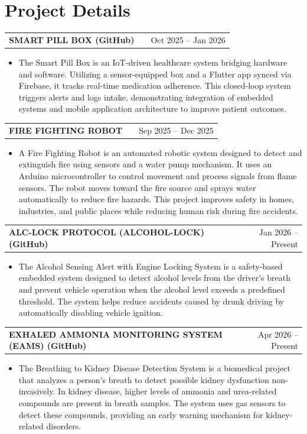 \documentclass[a4paper,12pt]{article}
\makeatletter
\newenvironment{joblong}[2]
    {
    \begin{tabularx}{\linewidth}{@{}l X r@{}}
    \textbf{#1} & \hfill &  #2 \\[3.75pt]
    \end{tabularx}
    \begin{minipage}[t]{\linewidth}
    \begin{itemize}[nosep,after=\strut, leftmargin=1em, itemsep=3pt,label=--]
    }
    {
    \end{itemize}
    \end{minipage}    
    }
\makeatother
\begin{document}
\section{Project Details}

\begin{joblong}{SMART PILL BOX (GitHub)}{Oct 2025 -- Jan 2026}
\item The Smart Pill Box is an IoT-driven healthcare system bridging hardware and software. Utilizing a sensor-equipped box and a Flutter app synced via Firebase, it tracks real-time medication adherence. This closed-loop system triggers alerts and logs intake, demonstrating integration of embedded systems and mobile application architecture to improve patient outcomes.
\end{joblong}

\begin{joblong}{FIRE FIGHTING ROBOT}{Sep 2025 -- Dec 2025}
\item A Fire Fighting Robot is an automated robotic system designed to detect and extinguish fire using sensors and a water pump mechanism. It uses an Arduino microcontroller to control movement and process signals from flame sensors. The robot moves toward the fire source and sprays water automatically to reduce fire hazards. This project improves safety in homes, industries, and public places while reducing human risk during fire accidents.
\end{joblong}

\begin{joblong}{ALC-LOCK PROTOCOL (ALCOHOL-LOCK) (GitHub)}{Jan 2026 -- Present}
\item The Alcohol Sensing Alert with Engine Locking System is a safety-based embedded system designed to detect alcohol levels from the driver's breath and prevent vehicle operation when the alcohol level exceeds a predefined threshold. The system helps reduce accidents caused by drunk driving by automatically disabling vehicle ignition.
\end{joblong}

\begin{joblong}{EXHALED AMMONIA MONITORING SYSTEM (EAMS) (GitHub)}{Apr 2026 -- Present}
\item The Breathing to Kidney Disease Detection System is a biomedical project that analyzes a person's breath to detect possible kidney dysfunction non-invasively. In kidney disease, higher levels of ammonia and urea-related compounds are present in breath samples. The system uses gas sensors to detect these compounds, providing an early warning mechanism for kidney-related disorders.
\end{joblong}
\end{document}
